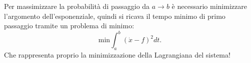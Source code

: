 Per massimizzare la probabilità di passaggio da $a\to b$ è necessario minimizzare l'argomento dell'esponenziale, quindi si ricava il tempo minimo di primo passaggio tramite un problema di minimo:
\[
    \text{min}\int_{a}^{b} \left(\dot{x}-f\right)^2 dt
.\] 
Che rappresenta proprio la minimizzazione della Lagrangiana del sistema!\\
\clearpage
